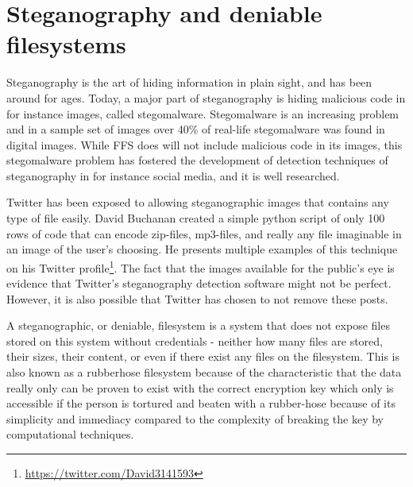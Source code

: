 \section{Steganography and deniable filesystems}
Steganography is the art of hiding information in plain sight, and has been around for ages. Today, a major part of steganography is hiding malicious code in for instance images, called stegomalware. Stegomalware is an increasing problem and in a sample set of images over 40\% of real-life stegomalware was found in digital images\cite{cuingSIMARGLStegwarePrimer2020}. While FFS does will not include malicious code in its images, this stegomalware problem has fostered the development of detection techniques of steganography in for instance social media, and it is well researched. 

Twitter has been exposed to allowing steganographic images that contains any type of file easily\cite{TwitterImagesCan}. David Buchanan created a simple python script of only 100 rows of code that can encode zip-files, mp3-files, and really any file imaginable in an image of the user's choosing\cite{buchananTweetablepolyglotpng2022}. He presents multiple examples of this technique on his Twitter profile\footnote{\url{https://twitter.com/David3141593}}. The fact that the images available for the public's eye is evidence that Twitter's steganography detection software might not be perfect. However, it is also possible that Twitter has chosen to not remove these posts.

A steganographic, or deniable, filesystem is a system that does not expose files stored on this system without credentials - neither how many files are stored, their sizes, their content, or even if there exist any files on the filesystem\cite{petersDEFYDeniableFile2014}. This is also known as a rubberhose filesystem because of the characteristic that the data really only can be proven to exist with the correct encryption key which only is accessible if the person is tortured and beaten with a rubber-hose because of its simplicity and immediacy compared to the complexity of breaking the key by computational techniques.

